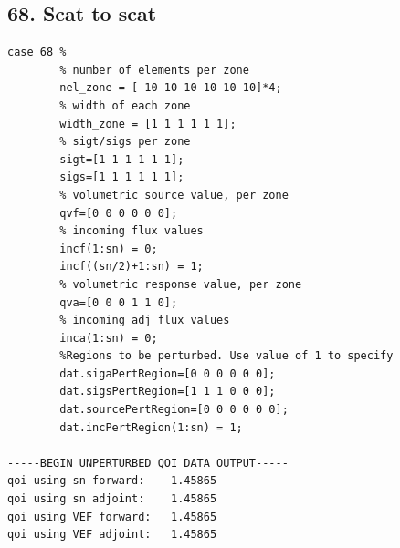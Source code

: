 \documentclass{article}
\begin{document}
\subsection{68. Scat to scat}
\begin{verbatim}
case 68 %
        % number of elements per zone
        nel_zone = [ 10 10 10 10 10 10]*4;
        % width of each zone
        width_zone = [1 1 1 1 1 1];
        % sigt/sigs per zone
        sigt=[1 1 1 1 1 1];
        sigs=[1 1 1 1 1 1];
        % volumetric source value, per zone
        qvf=[0 0 0 0 0 0];
        % incoming flux values
        incf(1:sn) = 0;
        incf((sn/2)+1:sn) = 1;
        % volumetric response value, per zone
        qva=[0 0 0 1 1 0];
        % incoming adj flux values
        inca(1:sn) = 0;
        %Regions to be perturbed. Use value of 1 to specify
        dat.sigaPertRegion=[0 0 0 0 0 0];
        dat.sigsPertRegion=[1 1 1 0 0 0];
        dat.sourcePertRegion=[0 0 0 0 0 0];
        dat.incPertRegion(1:sn) = 1; 
        
-----BEGIN UNPERTURBED QOI DATA OUTPUT----- 
qoi using sn forward: 	 1.45865 
qoi using sn adjoint: 	 1.45865 
qoi using VEF forward: 	 1.45865 
qoi using VEF adjoint: 	 1.45865 
\end{verbatim}
\end{document}
